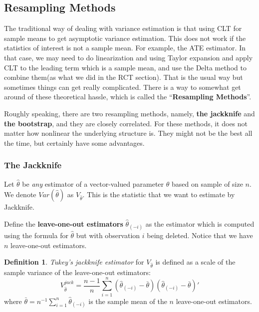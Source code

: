 \documentclass[11pt,a4paper]{amsart}
\theoremstyle{plain}
\theoremstyle{definition}
\newtheorem{definition}{Definition}
\begin{document}
\subsection{Resampling Methods}\hfill\par 
	The traditional way of dealing with variance estimation is that using CLT for sample means to get asymptotic variance estimation. This does not work if the statistics of interest is not a sample mean. For example, the ATE estimator. In that case, we may need to do linearization and using Taylor expansion and apply CLT to the leading term which is a sample mean, and use the Delta method to combine them(as what we did in the RCT section). That is the usual way but sometimes things can get really complicated. There is a way to somewhat get around of these theoretical hassle, which is called the ``\textbf{Resampling Methods}''.\par 
	Roughly speaking, there are two resampling methods, namely, \textbf{the jackknife} and \textbf{the bootstrap}, and they are closely correlated. For these methods, it does not matter how nonlinear the underlying structure is. They might not be the best all the time, but certainly have some advantages. 
	
\subsubsection{The Jackknife}\hfill\par 
	Let $\hat{\theta}$ be \emph{any} estimator of a vector-valued parameter $\theta$ based on sample of size $n$. We denote $Var(\hat{\theta})$ as $V_{\hat{\theta}}$. This is the statistic that we want to estimate by Jackknife. \par 
	Define the \textbf{ leave-one-out estimators} $\hat{\theta}_{(-i)}$ as the estimator which is computed using the formula for $\hat{\theta}$ but with observation $i$ being deleted. Notice that we have $n$  leave-one-out estimators. 
	\begin{definition}
		\textit{Tukey’s jackknife estimator} for $V_{\hat{\theta}}$ is defined as a scale of the sample variance of the leave-one-out estimators:
		\begin{equation}\label{jackknife}
		V_{\hat{\theta}}^{jack} = \frac{n-1}{n}\sum_{i=1}^{n}\left(\hat{\theta}_{(-i)}-\bar{\theta}\right)\left(\hat{\theta}_{(-i)}-\bar{\theta}\right)'
		\end{equation}
		where $\bar{\theta} = n^{-1}\sum_{i=1}^{n}\hat{\theta}_{(-i)}$ is the sample mean of the $n$ leave-one-out estimators.
	\end{definition}
\end{document}
